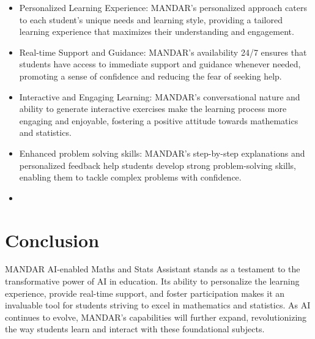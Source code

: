 \documentclass[20pt]{report}
\begin{document}
\begin{itemize}

\item Personalized Learning Experience: MANDAR's personalized approach caters to each student's unique needs and learning style, providing a tailored learning experience that maximizes their understanding and engagement.

\item Real-time Support and Guidance: MANDAR's availability 24/7 ensures that students have access to immediate support and guidance whenever needed, promoting a sense of confidence and reducing the fear of seeking help.

\item Interactive and Engaging Learning: MANDAR's conversational nature and ability to generate interactive exercises make the learning process more engaging and enjoyable, fostering a positive attitude towards mathematics and statistics.

\item Enhanced problem solving skills: MANDAR's step-by-step explanations and personalized feedback help students develop strong problem-solving skills, enabling them to tackle complex problems with confidence.
\item 
\end{itemize}

\section{Conclusion}

MANDAR AI-enabled Maths and Stats Assistant stands as a testament to the transformative power of AI in education. Its ability to personalize the learning experience, provide real-time support, and foster participation makes it an invaluable tool for students striving to excel in mathematics and statistics. As AI continues to evolve, MANDAR's capabilities will further expand, revolutionizing the way students learn and interact with these foundational subjects.
\end{document}
